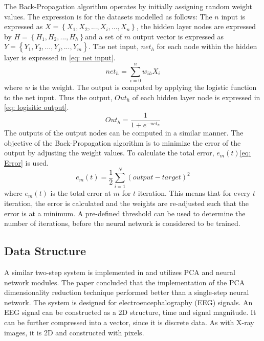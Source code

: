 \documentclass[11pt]{article}
\begin{document}
	The Back-Propagation algorithm operates by initially assigning random weight values. The expression is for the datasets modelled as follows:
	\newline 
	The $n$ input is expressed as $X = \left\{X_1, X_2, ... , X_i, ..., X_n\right\}$, the hidden layer nodes are expressed by $H = \left\{H_1, H_2, ... , H_h\right\}$and a set of $m$ output vector is expressed as $Y = \left\{Y_1, Y_2, ... , Y_j, ... , Y_m\right\}$. The net input, $net_h$ for each node within the hidden layer is expressed in \eqref{eq: net input}.
	\begin{equation}
		\label{eq: net input}
		net_{h} = \sum_{i = 0}^{n} w_{ih} X_i
	\end{equation}
	where $w$ is the weight.
	\newline
	The output is computed by applying the logistic function to the net input. Thus the output, $Out_h$ of each hidden layer node is expressed in \eqref{eq: logisitic output}.
	\begin{equation}
		\label{eq: logisitic output}
		Out_{h} = \frac{1}{1 + e^{-net_h}}
	\end{equation}
	The outputs of the output nodes can be computed in a similar manner. The objective of the Back-Propagation algorithm is to minimize the error of the output by adjusting the weight values. To calculate the total error, $e_m(t)$\eqref{eq: Error} is used.
	\begin{equation}
		\label{eq: Error}
		e_m(t) = \frac{1}{2} \sum_{i = 1}^{N} (output - target)^2
	\end{equation}
	where $e_m(t)$ is the total error at $m$ for $t$ iteration. 
	\newline
	This means that for every $t$ iteration, the error is calculated and the weights are re-adjusted such that the error is at a minimum. A pre-defined threshold can be used to determine the number of iterations, before the neural network is considered to be trained.
	
	\subsection{Data Structure}
	A similar two-step system is implemented in \cite{kottaimalai_eeg_2013} and utilizes PCA and neural network modules. The paper concluded that the implementation of the PCA dimensionality reduction technique performed better than a single-step neural network. The system is designed for electroencephalography (EEG) signals. An EEG signal can be constructed as a 2D structure, time and signal magnitude. It can be further compressed into a vector, since it is discrete data. As with X-ray images, it is 2D and constructed with pixels.
	
\end{document}
